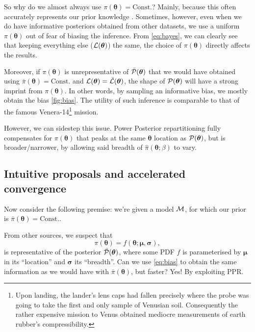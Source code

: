 \documentclass[usenatbib]{mnras}
\begin{document}
So why do we almost always use \(\pi (\bm{\theta}) = \text{Const.}\)?
Mainly, because this often accurately represents our prior knowledge
\citep{JeffreysPrior}. Sometimes, however, even when we do have
informative posteriors obtained from other datasets, we use a uniform
\(\pi (\bm{\theta})\) out of fear of biasing the inference. From
\ref{eq:bayes}, we can clearly see that keeping everything else
(\( {\cal L} (\bm{\theta})\)) the same, the choice of
\( \pi (\bm{\theta})\) directly affects the results.

Moreover, if \( \pi (\bm{\theta})\) is unrepresentative of
\( \bar{\cal P}(\bm{\theta})\) that we would have obtained using
\( \bar{\pi} (\bm{\theta}) = \text{Const.}\) and
\( {\cal L} (\bm{\theta}) = \bar{\cal L} (\bm{\theta})\), the shape of
\( {\cal P}(\bm{\theta})\) will have a strong imprint from
\( \pi (\bm{\theta})\). In other words, by sampling an informative
bias, we mostly obtain the bias \cref{fig:bias}.  The utility of such
inference is comparable to that of the famous Venera-14\footnote{Upon
  landing, the lander's lens caps had fallen precisely where the probe
  was going to take the first and only sample of Venusian soil. Consequently
  the rather expensive mission to Venus obtained mediocre measurements
  of earth rubber's compressibility.  } mission.

However, we can sidestep this issue. Power Posterior repartitioning
fully compensates for \( \pi (\bm{\theta})\) that peaks at the same
$\bm{\theta}$ location as \( {\cal P}(\bm{\theta})\), but is
broader/narrower, by allowing said breadth of
\( \hat{\pi} (\bm{\theta};\beta)\) to vary. 

\subsection{Intuitive proposals and accelerated
  convergence\label{sec:accelerating}}

Now consider the following premise: we're given a model \({\cal M}\),
for which our prior is \(\bar{\pi}(\bm{\theta}) = \text{Const.}\).

From other sources, we suspect that
\begin{equation}
  \pi (\bm{\theta}) = f(\bm{\theta}; \bm{\mu}, \bm{\sigma}),
 \label{eq:bias}
\end{equation}
is representative of the posterior \(\bar{\cal P}(\bm{\theta})\),
where some PDF $f$ is parameterised by \(\bm{\mu}\) in its
``location'' and \(\bm{\sigma}\) its ``breadth''. Can we use
\cref{eq:bias} to obtain the same information as we would have with
\(\bar{\pi}(\bm{\theta})\), but faster? Yes! By exploiting PPR.
\end{document}
